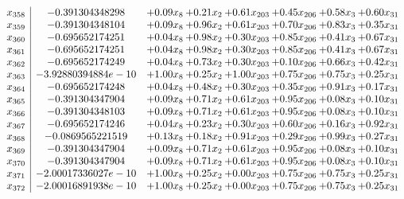 \documentclass[8pt]{article}
\begin{document}
\[\begin{array}{c| c c@{\hskip 2pt} c@{\hskip 2pt} c@{\hskip 2pt} c@{\hskip 2pt} c@{\hskip 2pt} c@{\hskip 2pt} }
 x_{358}   &  -0.391304348298 & +  0.09 x_{8} & +  0.21 x_{2} & +  0.61 x_{203} & +  0.45 x_{206} & +  0.58 x_{3} & +  0.60 x_{31}\\
 x_{359}   &  -0.391304348104 & +  0.09 x_{8} & +  0.96 x_{2} & +  0.61 x_{203} & +  0.70 x_{206} & +  0.83 x_{3} & +  0.35 x_{31}\\
 x_{360}   &  -0.695652174251 & +  0.04 x_{8} & +  0.98 x_{2} & +  0.30 x_{203} & +  0.85 x_{206} & +  0.41 x_{3} & +  0.67 x_{31}\\
 x_{361}   &  -0.695652174251 & +  0.04 x_{8} & +  0.98 x_{2} & +  0.30 x_{203} & +  0.85 x_{206} & +  0.41 x_{3} & +  0.67 x_{31}\\
 x_{362}   &  -0.695652174249 & +  0.04 x_{8} & +  0.73 x_{2} & +  0.30 x_{203} & +  0.10 x_{206} & +  0.66 x_{3} & +  0.42 x_{31}\\
 x_{363}   &  -3.92880394884e-10 & +  1.00 x_{8} & +  0.25 x_{2} & +  1.00 x_{203} & +  0.75 x_{206} & +  0.75 x_{3} & +  0.25 x_{31}\\
 x_{364}   &  -0.695652174248 & +  0.04 x_{8} & +  0.48 x_{2} & +  0.30 x_{203} & +  0.35 x_{206} & +  0.91 x_{3} & +  0.17 x_{31}\\
 x_{365}   &  -0.391304347904 & +  0.09 x_{8} & +  0.71 x_{2} & +  0.61 x_{203} & +  0.95 x_{206} & +  0.08 x_{3} & +  0.10 x_{31}\\
 x_{366}   &  -0.391304348103 & +  0.09 x_{8} & +  0.71 x_{2} & +  0.61 x_{203} & +  0.95 x_{206} & +  0.08 x_{3} & +  0.10 x_{31}\\
 x_{367}   &  -0.695652174246 & +  0.04 x_{8} & +  0.23 x_{2} & +  0.30 x_{203} & +  0.60 x_{206} & +  0.16 x_{3} & +  0.92 x_{31}\\
 x_{368}   &  -0.0869565221519 & +  0.13 x_{8} & +  0.18 x_{2} & +  0.91 x_{203} & +  0.29 x_{206} & +  0.99 x_{3} & +  0.27 x_{31}\\
 x_{369}   &  -0.391304347904 & +  0.09 x_{8} & +  0.71 x_{2} & +  0.61 x_{203} & +  0.95 x_{206} & +  0.08 x_{3} & +  0.10 x_{31}\\
 x_{370}   &  -0.391304347904 & +  0.09 x_{8} & +  0.71 x_{2} & +  0.61 x_{203} & +  0.95 x_{206} & +  0.08 x_{3} & +  0.10 x_{31}\\
 x_{371}   &  -2.00017336027e-10 & +  1.00 x_{8} & +  0.25 x_{2} & +  0.00 x_{203} & +  0.75 x_{206} & +  0.75 x_{3} & +  0.25 x_{31}\\
 x_{372}   &  -2.00016891938e-10 & +  1.00 x_{8} & +  0.25 x_{2} & +  0.00 x_{203} & +  0.75 x_{206} & +  0.75 x_{3} & +  0.25 x_{31}\\

\end{array}\]
\end{document}
